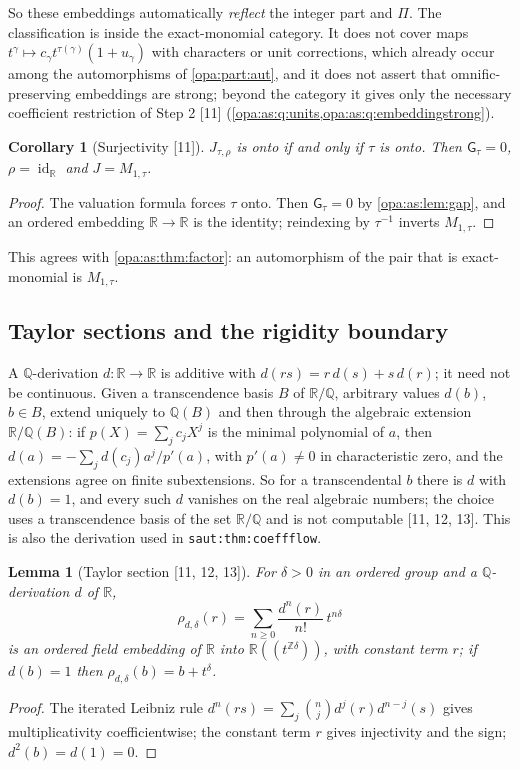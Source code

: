 \documentclass[11pt,oneside]{article}
\numberwithin{equation}{section}
\newtheorem{lemma}[lemma]{Lemma}
\newtheorem{corollary}[corollary]{Corollary}
\theoremstyle{definition}
\theoremstyle{remark}
\newcommand{\R}{\mathbb R}
\newcommand{\Q}{\mathbb Q}
\newcommand{\Z}{\mathbb Z}
\newcommand{\id}{\operatorname{id}}
\newcommand{\Hahn}[2]{#1((t^{#2}))}
\newcommand{\src}[1]{\textup{\textsf{\small[#1]}}}
\newcommand{\lbl}[1]{\nolinkurl{#1}}
\newcommand{\gap}{\mathsf G}
\begin{document}
So these embeddings automatically \emph{reflect} the integer part and $\Pi$. The classification is
inside the exact-monomial category. It does not cover maps $t^\gamma\mapsto
c_\gamma t^{\tau(\gamma)}(1+u_\gamma)$ with characters or unit corrections, which already occur among
the automorphisms of \cref{opa:part:aut}, and it does not assert that omnific-preserving embeddings
are strong; beyond the category it gives only the necessary coefficient restriction of Step 2
\src{11} (\cref{opa:as:q:units,opa:as:q:embeddingstrong}).

\begin{corollary}[Surjectivity \src{11}]\label{opa:as:cor:onto}
$J_{\tau,\rho}$ is onto if and only if $\tau$ is onto. Then $\gap_\tau=0$, $\rho=\id_\R$ and
$J=M_{1,\tau}$.
\end{corollary}
\begin{proof}
The valuation formula forces $\tau$ onto. Then $\gap_\tau=0$ by \cref{opa:as:lem:gap}, and an ordered
embedding $\R\to\R$ is the identity; reindexing by $\tau^{-1}$ inverts $M_{1,\tau}$.
\end{proof}

This agrees with \cref{opa:as:thm:factor}: an automorphism of the pair that is exact-monomial is
$M_{1,\tau}$.

\subsection{Taylor sections and the rigidity boundary}\label{opa:as:sub:taylor}

A $\Q$-derivation $d:\R\to\R$ is additive with $d(rs)=r\,d(s)+s\,d(r)$; it need not be continuous.
Given a transcendence basis $B$ of $\R/\Q$, arbitrary values $d(b)$, $b\in B$, extend uniquely to
$\Q(B)$ and then through the algebraic extension $\R/\Q(B)$: if $p(X)=\sum_jc_jX^j$ is the minimal
polynomial of $a$, then $d(a)=-\sum_jd(c_j)a^j/p'(a)$, with $p'(a)\ne0$ in characteristic zero, and
the extensions agree on finite subextensions. So for a transcendental $b$ there is $d$ with $d(b)=1$,
and every such $d$ vanishes on the real algebraic numbers; the choice uses a transcendence basis of
the set $\R/\Q$ and is not computable \src{11, 12, 13}. This is also the derivation used in
\lbl{saut:thm:coeffflow}.

\begin{lemma}[Taylor section \src{11, 12, 13}]\label{opa:as:lem:taylorsection}
For $\delta>0$ in an ordered group and a $\Q$-derivation $d$ of $\R$,
\begin{equation}\label{opa:as:eq:taylorsection}
 \rho_{d,\delta}(r)=\sum_{n\ge0}\frac{d^n(r)}{n!}\,t^{n\delta}
\end{equation}
is an ordered field embedding of $\R$ into $\Hahn\R{\Z\delta}$, with constant term $r$; if
$d(b)=1$ then $\rho_{d,\delta}(b)=b+t^\delta$.
\end{lemma}
\begin{proof}
The iterated Leibniz rule $d^n(rs)=\sum_j\binom njd^j(r)d^{n-j}(s)$ gives multiplicativity
coefficientwise; the constant term $r$ gives injectivity and the sign; $d^2(b)=d(1)=0$.
\end{proof}
\end{document}
